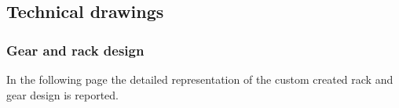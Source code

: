 \clearpage
\subsection{Technical drawings}
\subsubsection{Gear and rack design}
In the following page the detailed representation of the custom created rack and gear design is reported.

